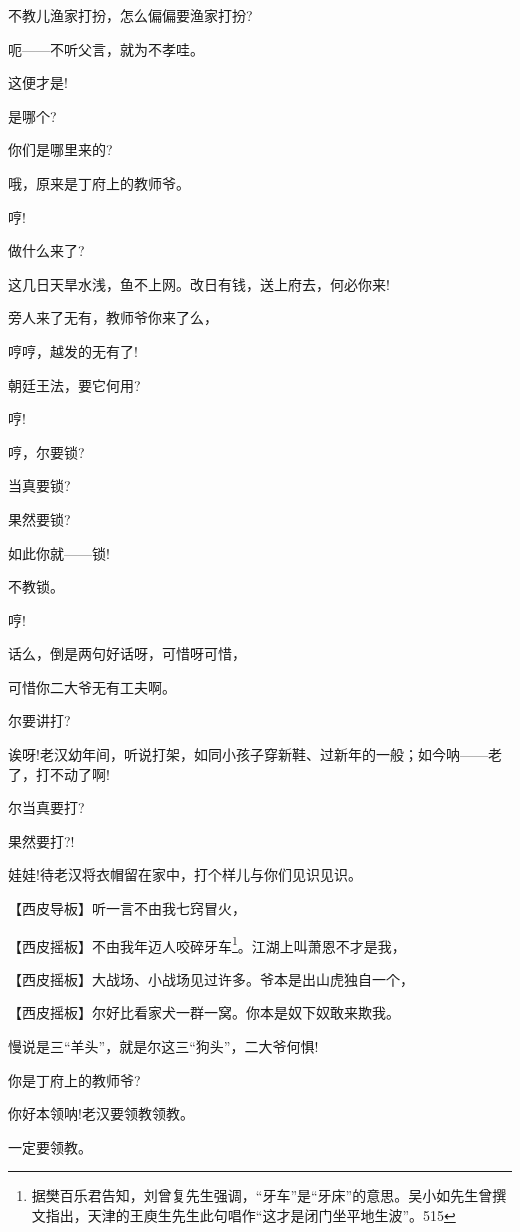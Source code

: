 {不教儿渔家打扮，怎么偏偏要渔家打扮?}

{呃------不听父言，就为不孝哇。}

{这便才是!}

{是哪个?}

{你们是哪里来的?}

{哦，原来是丁府上的教师爷。}

{哼!}

{做什么来了?}

{这几日天旱水浅，鱼不上网。改日有钱，送上府去，何必你来!}

{旁人来了无有，教师爷你来了么，}

{哼哼，越发的无有了!}

{朝廷王法，要它何用?}

{哼!}

{哼，尔要锁?}

{当真要锁?}

{果然要锁?}

{如此你就------锁!}

{不教锁。}

{哼!}

{话么，倒是两句好话呀，可惜呀可惜，}

{可惜你二大爷无有工夫啊。}

{尔要讲打?}

{诶呀!老汉幼年间，听说打架，如同小孩子穿新鞋、过新年的一般；如今呐------老了，打不动了啊!}

{尔当真要打?}

{果然要打?!}

{娃娃!待老汉将衣帽留在家中，打个样儿与你们见识见识。}

\setlength{\hangindent}{60pt} {【{\akai 西皮导板}】听一言不由我七窍冒火，}

\setlength{\hangindent}{60pt} {【{\akai 西皮摇板}】不由我年迈人咬碎牙车}\footnote{ 据樊百乐君告知，刘曾复先生强调，``牙车''是``牙床''的意思。吴小如先生曾撰文指出，天津的王庾生先生此句唱作``这才是闭门坐平地生波''。{515}}{。江湖上叫萧恩不才是我，}

\setlength{\hangindent}{60pt} {【{\akai 西皮摇板}】大战场、小战场见过许多。爷本是出山虎独自一个，}

\setlength{\hangindent}{60pt} {【{\akai 西皮摇板}】尔好比看家犬一群一窝。你本是奴下奴敢来欺我。}

{慢说是三``羊头''，就是尔这三``狗头''，二大爷何惧!}

{你是丁府上的教师爷?}

{你好本领呐!老汉要领教领教。}

{一定要领教。}

